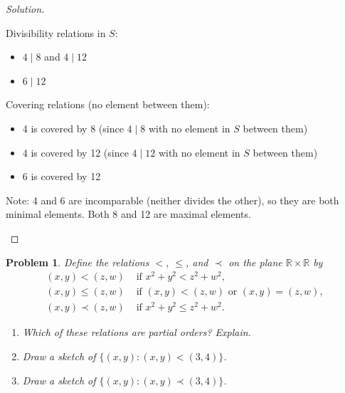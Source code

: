 \documentclass[12pt]{article}
\newtheorem{problem}{Problem}
\newcommand{\RR}{\ensuremath{\mathbb R}}
\begin{document}
\begin{proof}[Solution]
~

Divisibility relations in $S$:
\begin{itemize}
    \item $4 \mid 8$ and $4 \mid 12$
    \item $6 \mid 12$
\end{itemize}

Covering relations (no element between them):
\begin{itemize}
    \item 4 is covered by 8 (since $4 \mid 8$ with no element in $S$ between them)
    \item 4 is covered by 12 (since $4 \mid 12$ with no element in $S$ between them)
    \item 6 is covered by 12
\end{itemize}

Note: 4 and 6 are incomparable (neither divides the other), so they are both minimal elements. Both 8 and 12 are maximal elements.

\begin{center}
\end{center}
\end{proof}

\setcounter{problem}{14}
\begin{problem}
Define the relations $<$, $\leq$, and $\prec$ on the plane $\RR \times \RR$ by
\begin{align*}
(x,y) < (z,w) &\text{ if } x^2 + y^2 < z^2 + w^2, \\
(x,y) \leq (z,w) &\text{ if } (x,y) < (z,w) \text{ or } (x,y) = (z,w), \\
(x,y) \prec (z,w) &\text{ if } x^2 + y^2 \leq z^2 + w^2.
\end{align*}

\begin{enumerate}[label=(\alph*)]
    \item Which of these relations are partial orders? Explain.
    \setcounter{enumi}{2}
    
    \item Draw a sketch of $\{(x,y) : (x,y) < (3,4)\}$.
    
    \item Draw a sketch of $\{(x,y) : (x,y) \prec (3,4)\}$.
\end{enumerate}
\end{problem}
\end{document}
